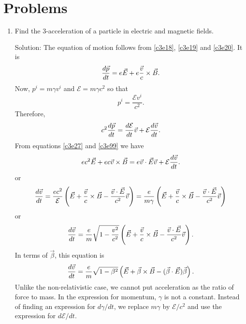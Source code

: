 \section{Problems}
\begin{enumerate}
\item Find the 3-acceleration of a particle in electric and magnetic fields.
\item[Solution:] The equation of motion follows from \eqref{c3e18}, \eqref{c3e19}
and \eqref{c3e20}. It is
\begin{equation}\label{c3e99}
\frac{d{\vec{p}}}{d{t}} = e\vec{E} + e\frac{\vec{v}}{c}\times\vec{B}.
\end{equation}
Now, $p^i = m\gamma v^i$ and $\mathcal{E} = m\gamma c^2$ so that 
\[
p^i = \frac{\mathcal{E} v^i}{c^2}.
\]
Therefore,
\[
c^2\frac{d{\vec{p}}}{d{t}} = \frac{d{\mathcal{E}}}{d{t}}\vec{v} + \mathcal{E}\frac{d{\vec{v}}}{d{t}}.
\]
From equations \eqref{c3e27} and \eqref{c3e99} we have
\[
ec^2\vec{E} + ec\vec{v}\times\vec{B} = e\vec{v}\cdot\vec{E}\vec{v} + \mathcal{E}\frac{d{\vec{v}}}{d{t}}.
\]
or
\[
\frac{d{\vec{v}}}{d{t}} = \frac{ec^2}{\mathcal{E}}
\left(\vec{E} + \frac{\vec{v}}{c}\times\vec{B} - \frac{\vec{v}\cdot\vec{E}}{c^2}\vec{v}\right)
= \frac{e}{m\gamma}
\left(\vec{E} + \frac{\vec{v}}{c}\times\vec{B} - \frac{\vec{v}\cdot\vec{E}}{c^2}\vec{v}\right)
\]
or
\begin{equation}\label{c3e100}
\frac{d{\vec{v}}}{d{t}} = \frac{e}{m}\sqrt{1 - \frac{v^2}{c^2}}
\left(\vec{E} + \frac{\vec{v}}{c}\times\vec{B} - \frac{\vec{v}\cdot\vec{E}}{c^2}\vec{v}\right).
\end{equation}
In terms of $\vec{\beta}$, this equation is
\begin{equation}\label{c3e101}
\frac{d{\vec{v}}}{d{t}} = \frac{e}{m}\sqrt{1 - \beta^2}
\left(\vec{E} + \vec{\beta}\times\vec{B} - (\vec{\beta}\cdot\vec{E})\vec{\beta}\right).
\end{equation}
Unlike the non-relativistic case, we cannot put acceleration as the ratio of 
force to mass. In the expression for momentum, $\gamma$ is not a constant. Instead of
finding an expression for $d\gamma/dt$, we replace $m\gamma$ by $\mathcal{E}/c^2$
and use the expression for $d\mathcal{E}/dt$.


\end{enumerate}
